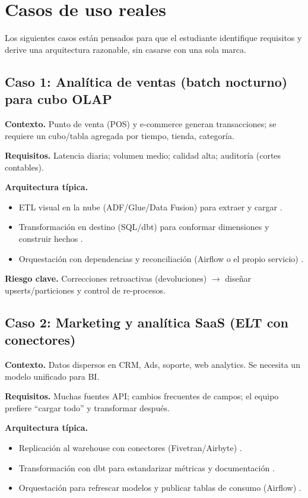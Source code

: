 \documentclass[12pt]{article}
\begin{document}
\section{Casos de uso reales}
Los siguientes casos están pensados para que el estudiante identifique requisitos y derive una arquitectura razonable, sin casarse con una sola marca.

\subsection{Caso 1: Analítica de ventas (batch nocturno) para cubo OLAP}
\textbf{Contexto.} Punto de venta (POS) y e-commerce generan transacciones; se requiere un cubo/tabla agregada por tiempo, tienda, categoría.

\textbf{Requisitos.} Latencia diaria; volumen medio; calidad alta; auditoría (cortes contables).

\textbf{Arquitectura típica.}
\begin{itemize}[leftmargin=*]
  \item ETL visual en la nube (ADF/Glue/Data Fusion) para extraer y cargar \cite{ms_adf_intro,aws_glue_what,gcp_data_fusion_overview}.
  \item Transformación en destino (SQL/dbt) para conformar dimensiones y construir hechos \cite{dbt_intro}.
  \item Orquestación con dependencias y reconciliación (Airflow o el propio servicio) \cite{airflow_what_is}.
\end{itemize}

\textbf{Riesgo clave.} Correcciones retroactivas (devoluciones) $\rightarrow$ diseñar upserts/particiones y control de re-procesos.

\subsection{Caso 2: Marketing y analítica SaaS (ELT con conectores)}
\textbf{Contexto.} Datos dispersos en CRM, Ads, soporte, web analytics. Se necesita un modelo unificado para BI.

\textbf{Requisitos.} Muchas fuentes API; cambios frecuentes de campos; el equipo prefiere “cargar todo” y transformar después.

\textbf{Arquitectura típica.}
\begin{itemize}[leftmargin=*]
  \item Replicación al warehouse con conectores (Fivetran/Airbyte) \cite{fivetran_getting_started,airbyte_docs}.
  \item Transformación con dbt para estandarizar métricas y documentación \cite{dbt_intro,dbt_docs_build}.
  \item Orquestación para refrescar modelos y publicar tablas de consumo (Airflow) \cite{airflow_what_is}.
\end{itemize}
\end{document}
